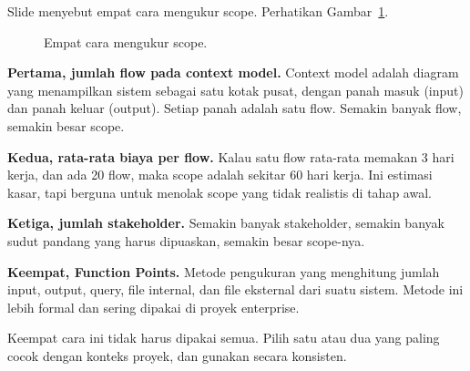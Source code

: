 \documentclass[11pt,a4paper]{article}
\begin{document}
Slide menyebut empat cara mengukur scope. Perhatikan Gambar~\ref{fig:measure}.

\begin{figure}[H]
	\centering
	\caption{Empat cara mengukur scope.}
	\label{fig:measure}
\end{figure}

\textbf{Pertama, jumlah flow pada context model.} Context model adalah diagram yang menampilkan sistem sebagai satu kotak pusat, dengan panah masuk (input) dan panah keluar (output). Setiap panah adalah satu flow. Semakin banyak flow, semakin besar scope.

\textbf{Kedua, rata-rata biaya per flow.} Kalau satu flow rata-rata memakan 3 hari kerja, dan ada 20 flow, maka scope adalah sekitar 60 hari kerja. Ini estimasi kasar, tapi berguna untuk menolak scope yang tidak realistis di tahap awal.

\textbf{Ketiga, jumlah stakeholder.} Semakin banyak stakeholder, semakin banyak sudut pandang yang harus dipuaskan, semakin besar scope-nya.

\textbf{Keempat, Function Points.} Metode pengukuran yang menghitung jumlah input, output, query, file internal, dan file eksternal dari suatu sistem. Metode ini lebih formal dan sering dipakai di proyek enterprise.

Keempat cara ini tidak harus dipakai semua. Pilih satu atau dua yang paling cocok dengan konteks proyek, dan gunakan secara konsisten.
\end{document}
